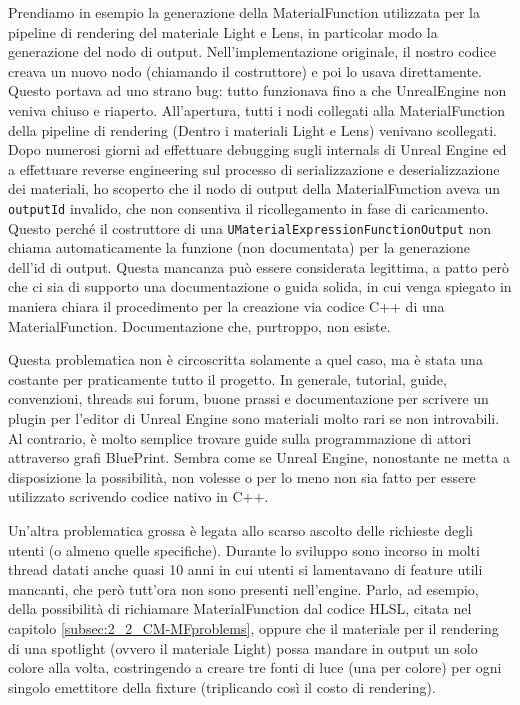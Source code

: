 \documentclass[main.tex]{subfiles}
\begin{document}
Prendiamo in esempio la generazione della MaterialFunction utilizzata per la pipeline di rendering del materiale Light e Lens, in particolar modo la generazione del nodo di output. Nell'implementazione originale, il nostro codice creava un nuovo nodo (chiamando il costruttore) e poi lo usava direttamente. Questo portava ad uno strano bug: tutto funzionava fino a che UnrealEngine non veniva chiuso e riaperto. All'apertura, tutti i nodi collegati alla MaterialFunction della pipeline di rendering (Dentro i materiali Light e Lens) venivano scollegati. Dopo numerosi giorni ad effettuare debugging sugli internals di Unreal Engine ed a effettuare reverse engineering sul processo di serializzazione e deserializzazione dei materiali, ho scoperto che il nodo di output della MaterialFunction aveva un \lstinline{outputId} invalido, che non consentiva il ricollegamento in fase di caricamento. Questo perché il costruttore di una \lstinline{UMaterialExpressionFunctionOutput} non chiama automaticamente la funzione (non documentata) per la generazione dell'id di output. Questa mancanza può essere considerata legittima, a patto però che ci sia di supporto una documentazione o guida solida, in cui venga spiegato in maniera chiara il procedimento per la creazione via codice C++ di una MaterialFunction. Documentazione che, purtroppo, non esiste.

Questa problematica non è circoscritta solamente a quel caso, ma è stata una costante per praticamente tutto il progetto. In generale, tutorial, guide, convenzioni, threads sui forum, buone prassi e documentazione per scrivere un plugin per l'editor di Unreal Engine sono materiali molto rari se non introvabili. Al contrario, è molto semplice trovare guide sulla programmazione di attori attraverso grafi BluePrint. Sembra come se Unreal Engine, nonostante ne metta a disposizione la possibilità, non volesse o per lo meno non sia fatto per essere utilizzato scrivendo codice nativo in C++.
\newline

Un'altra problematica grossa è legata allo scarso ascolto delle richieste degli utenti (o almeno quelle specifiche). Durante lo sviluppo sono incorso in molti thread datati anche quasi 10 anni in cui utenti si lamentavano di feature utili mancanti, che però tutt'ora non sono presenti nell'engine. Parlo, ad esempio, della possibilità di richiamare MaterialFunction dal codice HLSL, citata nel capitolo \ref{subsec:2_2_CM-MFproblems}, oppure che il materiale per il rendering di una spotlight (ovvero il materiale Light) possa mandare in output un solo colore alla volta, costringendo a creare tre fonti di luce (una per colore) per ogni singolo emettitore della fixture (triplicando così il costo di rendering). \cite{rgbSpotlight}\newline
\end{document}
